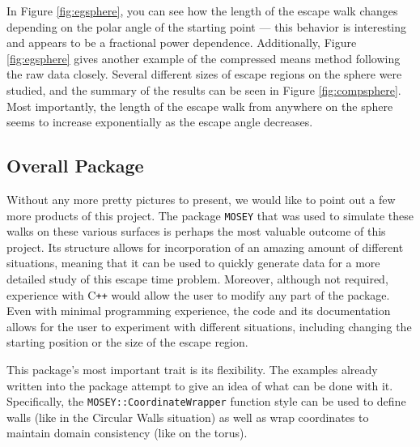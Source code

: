 \documentclass[12pt]{article}
\begin{document}
		In Figure \ref{fig:egsphere}, you can see how the length of the escape walk changes depending on the polar angle of the starting point --- this behavior is interesting and appears to be a fractional power dependence.
		Additionally, Figure \ref{fig:egsphere} gives another example of the compressed means method following the raw data closely.
		Several different sizes of escape regions on the sphere were studied, and the summary of the results can be seen in Figure \ref{fig:compsphere}.
		Most importantly, the length of the escape walk from anywhere on the sphere seems to increase exponentially as the escape angle decreases.
		
	\subsection{Overall Package}
		Without any more pretty pictures to present, we would like to point out a few more products of this project.
		The package \texttt{MOSEY} that was used to simulate these walks on these various surfaces is perhaps the most valuable outcome of this project.
		Its structure allows for incorporation of an amazing amount of different situations, meaning that it can be used to quickly generate data for a more detailed study of this escape time problem.
		Moreover, although not required, experience with C\texttt{++} would allow the user to modify any part of the package.
		Even with minimal programming experience, the code and its documentation allows for the user to experiment with different situations, including changing the starting position or the size of the escape region.
		
		This package's most important trait is its flexibility.
		The examples already written into the package attempt to give an idea of what can be done with it.
		Specifically, the \texttt{MOSEY::CoordinateWrapper} function style can be used to define walls (like in the Circular Walls situation) as well as wrap coordinates to maintain domain consistency (like on the torus).
		
\end{document}

